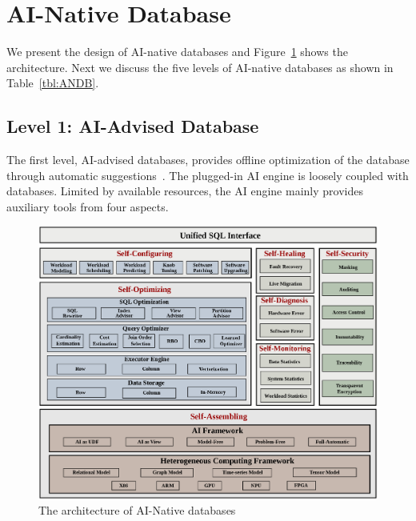 

\section{AI-Native Database}
\label{sec:ANDB}

We present the design of AI-native databases and Figure~\ref{fig:ANDB} shows the architecture. Next we discuss the five levels of AI-native databases as shown in Table~\ref{tbl:ANDB}.

\subsection{Level 1: AI-Advised Database}
\label{subsec: advised}

The first level, AI-advised databases, provides offline optimization of the database through automatic suggestions~\cite{DBLP:conf/sigmod/AkenPGZ17, DBLP:conf/vldb/qtune19, DBLP:journals/corr/abs-1802-00884}. The plugged-in AI engine is loosely coupled with databases. Limited by available resources, the AI engine mainly provides auxiliary tools from four aspects. 


\begin{figure}[!t]
\centering
\includegraphics[width=1.0\textwidth, height=0.89\textwidth]{figs/ANDB-arch-v3.eps}
\vspace{-1em}
\caption{The architecture of AI-Native databases}
\label{fig:ANDB}
\vspace{-1em}
\end{figure}

